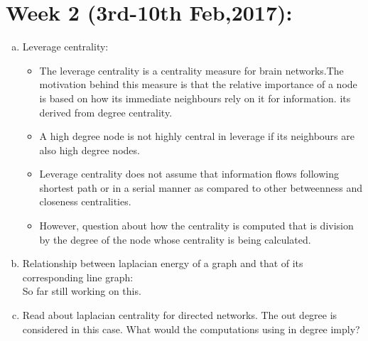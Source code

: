 \documentclass[10pt,a4paper]{article}
\begin{document}
\section*{Week 2 (3rd-10th Feb,2017):}
\begin{enumerate}[a)]
\item Leverage centrality:
\begin{itemize}
\item The leverage centrality is a centrality measure for brain networks.The motivation behind this measure is that the relative importance of a node is based on how its immediate neighbours rely on it for information. its derived from degree centrality.
\item A high degree node is not highly central in leverage if its neighbours are also high degree nodes.
\item Leverage centrality does not assume that information flows following shortest path or in a serial manner as compared to other betweenness and closeness centralities.
\item However, question about how the centrality is computed that is division by the degree of the node whose centrality is being calculated.
\end{itemize}
\item Relationship between laplacian energy of a graph and that of its corresponding line graph:\\
So far still working on this.

\item Read about laplacian centrality for directed networks. The out degree is considered in this case.
What would the computations using in degree imply?

\end{enumerate}
\end{document}
